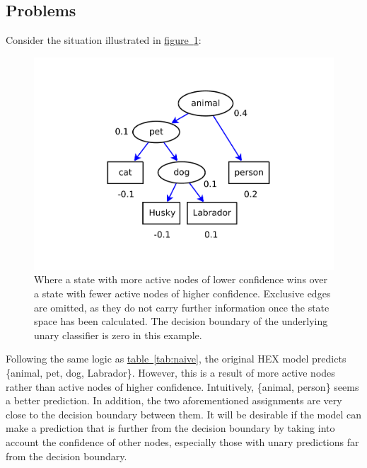 \documentclass[11pt,a4paper]{article}
\begin{document}
\subsection{Problems}
\label{sec:problem}

Consider the situation illustrated in \hyperref[fig:depth]{figure~\ref{fig:depth}}:
\begin{figure}[htbp]
\centering\includegraphics[scale=0.5]{depth.pdf}
\caption{Where a state with more active nodes of lower confidence wins over a state with fewer active nodes of higher confidence. Exclusive edges are omitted, as they do not carry further information once the state space has been calculated. The decision boundary of the underlying unary classifier is zero in this example.}
\label{fig:depth}
\end{figure}

Following the same logic as \hyperref[tab:naive]{table~\ref{tab:naive}}, the original HEX model predicts \{animal, pet, dog, Labrador\}. However, this is a result of more active nodes rather than active nodes of higher confidence. Intuitively, \{animal, person\} seems a better prediction. In addition, the two aforementioned assignments are very close to the decision boundary between them. It will be desirable if the model can make a prediction that is further from the decision boundary by taking into account the confidence of other nodes, especially those with unary predictions far from the decision boundary.
\end{document}
